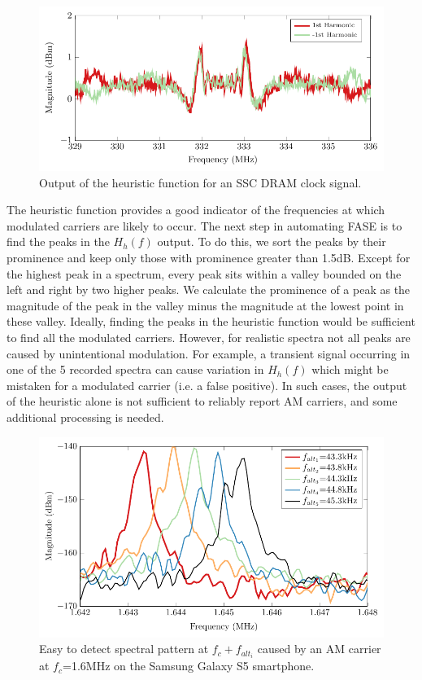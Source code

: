 \begin{figure}[htb]
\centering
\includegraphics[trim=0.1in 0.10in 0.1in 0.09in,clip,width=5in]{../fase/Data/lx61_mem_ssc_c.pdf}%
\caption{Output of the heuristic function for an SSC DRAM clock signal.}%
\label{lx61_mem_ssc_c}
\end{figure}

The heuristic function provides a good indicator of the frequencies at which modulated carriers are likely to occur. The next step in automating FASE is to find the peaks in the $H_h(f)$ output. To do this, we sort the peaks by their prominence and keep only those with prominence greater than 1.5dB. Except for the highest peak in a spectrum, every peak sits within a valley bounded on the left and right by two higher peaks. We calculate the prominence of a peak as the magnitude of the peak in the valley minus the magnitude at the lowest point in these valley. Ideally, finding the peaks in the heuristic function would be sufficient to find all the modulated carriers. However, for realistic spectra not all peaks are caused by unintentional modulation. For example, a transient signal occurring in one of the 5 recorded spectra can cause variation in $H_h(f)$ which might be mistaken for a modulated carrier (i.e. a false positive). In such cases, the output of the heuristic alone is not sufficient to reliably report AM carriers, and some additional processing is needed.

\begin{figure}[htb]
\centering
\includegraphics[width=5in]{../eucap_fase/Drawing/sb_good.pdf}
\caption{Easy to detect spectral pattern at $f_c+f_{alt_i}$ caused by an AM carrier at $f_c$=1.6MHz on the Samsung Galaxy S5 smartphone.}
\label{sb_good}
\end{figure}

